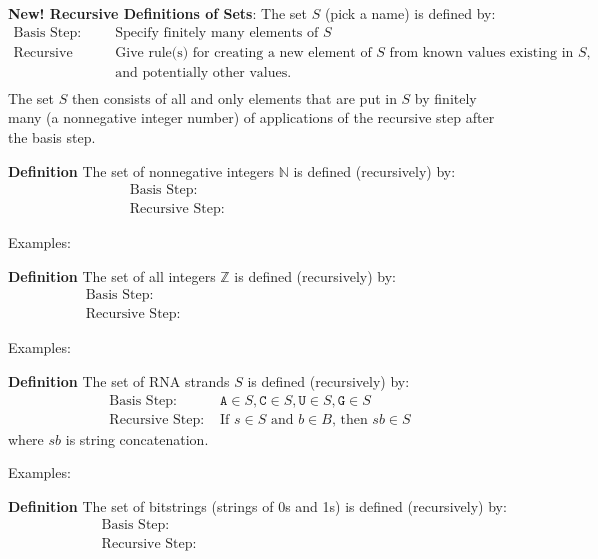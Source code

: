 \documentclass[12pt, oneside]{article}
\newcommand{\A}[0]{\texttt{A}}
\newcommand{\C}[0]{\texttt{C}}
\newcommand{\G}[0]{\texttt{G}}
\newcommand{\U}[0]{\texttt{U}}
\begin{document}
 

{\bf New! Recursive Definitions of Sets}: The set $S$ (pick a name) is defined by:
\[
\begin{array}{ll}
\textrm{Basis Step: } & \textrm{Specify finitely many elements of } S\\
\textrm{Recursive Step: } & \textrm{Give rule(s) for creating a new element of } S \textrm{ from known values existing in } S, \\
& \textrm{and potentially other values}. \\
\end{array}
\]
The set $S$ then consists of all and only elements that are put in $S$ by finitely many (a nonnegative integer number) of
applications of the recursive step after the basis step. 

{\bf Definition} The set of nonnegative integers $\mathbb{N}$ is defined (recursively) by: 
\[
\begin{array}{ll}
\textrm{Basis Step: } & \phantom{0 \in \mathbb{N}} \\
\textrm{Recursive Step: } & \phantom{\textrm{If } n \in \mathbb{N} \textrm{, then } n+1 \in \mathbb{N}}
\end{array}
\]

Examples: 

{\bf Definition} The set of all integers $\mathbb{Z}$ is defined (recursively) by: 
\[
\begin{array}{ll}
\textrm{Basis Step: } & \phantom{0 \in \mathbb{Z}} \\
\textrm{Recursive Step: } & \phantom{\textrm{If } x \in \mathbb{Z} \textrm{, then } x+1 \in \mathbb{Z}
\textrm{ and } x-1 \in \mathbb{Z}}
\end{array}
\]

Examples: 

\vfill

{\bf Definition} The set of RNA strands $S$ is defined (recursively) by:
\[
\begin{array}{ll}
\textrm{Basis Step: } & \A \in S, \C \in S, \U \in S, \G \in S \\
\textrm{Recursive Step: } & \textrm{If } s \in S\textrm{ and }b \in B \textrm{, then }sb \in S
\end{array}
\]
where $sb$ is string concatenation.

Examples: 

\vfill

{\bf Definition} The set of bitstrings (strings of 0s and 1s) is defined (recursively) by:
\[
\begin{array}{ll}
\textrm{Basis Step: } & \phantom{\lambda \in X} \\
\textrm{Recursive Step: } & \phantom{\textrm{If } s \in X \textrm{, then } s0 \in X \text{ and } s1 \in X}
\end{array}
\]
\end{document}
